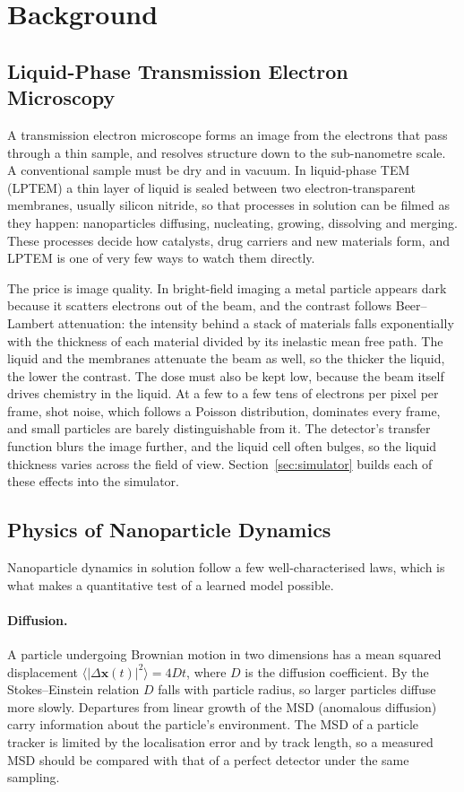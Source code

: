 \section{Background}
\label{sec:background}

\subsection{Liquid-Phase Transmission Electron Microscopy}
\label{sec:lptem}

A transmission electron microscope forms an image from the electrons that pass through
a thin sample, and resolves structure down to the sub-nanometre scale. A conventional
sample must be dry and in vacuum. In liquid-phase TEM (LPTEM) a thin layer of liquid is
sealed between two electron-transparent membranes, usually silicon nitride, so that
processes in solution can be filmed as they happen: nanoparticles diffusing, nucleating,
growing, dissolving and merging. These processes decide how catalysts, drug carriers and
new materials form, and LPTEM is one of very few ways to watch them directly.

The price is image quality. In bright-field imaging a metal particle appears dark
because it scatters electrons out of the beam, and the contrast follows Beer--Lambert
attenuation: the intensity behind a stack of materials falls exponentially with the
thickness of each material divided by its inelastic mean free path. The liquid and the
membranes attenuate the beam as well, so the thicker the liquid, the lower the
contrast. The dose must also be kept low, because the beam itself drives chemistry in the
liquid. At a few to a few tens of electrons per pixel per frame, shot noise, which
follows a Poisson distribution, dominates every frame, and small particles are barely
distinguishable from it. The detector's transfer function blurs the image further, and
the liquid cell often bulges, so the liquid thickness varies across the field of view.
Section~\ref{sec:simulator} builds each of these effects into the simulator.

\subsection{Physics of Nanoparticle Dynamics}
\label{sec:physics}

Nanoparticle dynamics in solution follow a few well-characterised laws, which is what
makes a quantitative test of a learned model possible.

\paragraph{Diffusion.} A particle undergoing Brownian motion in two dimensions has a
mean squared displacement $\langle |\Delta\mathbf{x}(t)|^2 \rangle = 4Dt$, where $D$ is
the diffusion coefficient. By the Stokes--Einstein relation $D$ falls with particle
radius, so larger particles diffuse more slowly. Departures from linear growth of the
MSD (anomalous diffusion) carry information about the particle's environment. The MSD
of a particle tracker is limited by the localisation error and by track length, so a
measured MSD should be compared with that of a perfect detector under the same
sampling.

